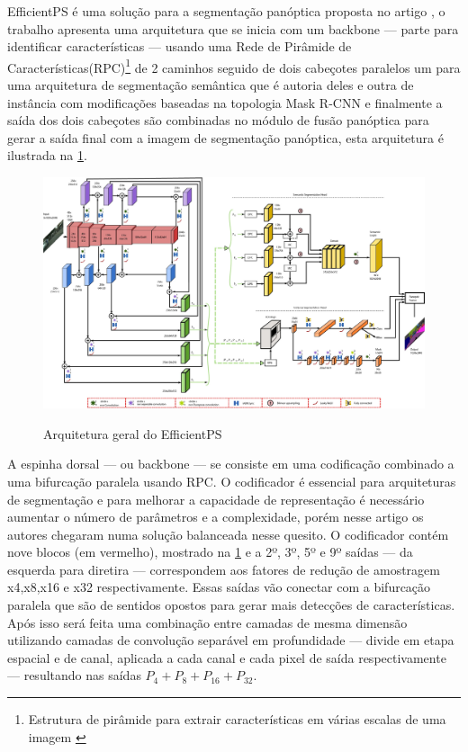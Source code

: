 
EfficientPS é uma solução para a segmentação panóptica proposta no artigo \space{}, o trabalho apresenta uma arquitetura que se inicia com um backbone — parte para identificar características — usando uma Rede de Pirâmide de Características(RPC)\footnote{Estrutura de pirâmide para extrair características em várias escalas de uma imagem \space\cite{piramide}} de 2 caminhos seguido de dois cabeçotes paralelos um para uma arquitetura de segmentação semântica que é autoria deles e outra de instância com modificações baseadas na topologia Mask R-CNN e finalmente a saída dos dois cabeçotes são combinadas no módulo de fusão panóptica para gerar a saída final com a imagem de segmentação panóptica, esta arquitetura é ilustrada na \cref{fig:arqEP}.

\begin{figure}[ht]
	\caption{Arquitetura geral do EfficientPS}
	\centering %
	\includegraphics[width=15cm]{figures/arqEP.jpg} %
	\label{fig:arqEP}
\end{figure}


A espinha dorsal — ou backbone — se consiste em uma codificação combinado a uma bifurcação paralela usando RPC. O codificador é essencial para arquiteturas de segmentação e para melhorar a capacidade de representação é necessário aumentar o número de parâmetros e a complexidade, porém nesse artigo os autores chegaram numa solução balanceada nesse quesito. O codificador contém nove blocos (em vermelho), mostrado na \cref{fig:arqEP} e a 2º, 3º, 5º e 9º saídas — da esquerda para diretira — correspondem aos fatores de redução de amostragem x4,x8,x16 e x32 respectivamente. Essas saídas vão conectar com a bifurcação paralela que são de sentidos opostos para gerar mais detecções de características. Após isso será feita uma combinação entre camadas de mesma dimensão utilizando camadas de convolução separável em profundidade — divide em etapa espacial e de canal, aplicada a cada canal e cada pixel de saída respectivamente — resultando nas saídas $ P_4 + P_8 + P_{16} + P_{32} $\cite{mohan2020efficientps, redes-neurais-convolucionais-separaveis-em-profundidade}.

